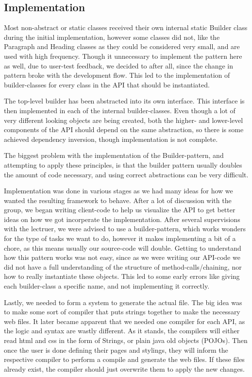 \documentclass[12pt]{article}
\begin{document}
    \subsection{Implementation}

    Most non-abstract or static classes received their own internal static Builder class during the initial implementation, however some classes did not, like the Paragraph and Heading classes as they could be considered very small, and are used with high frequency. Though it unnecessary to implement the pattern here as well, due to user-test feedback, we decided to after all, since the change in pattern broke with the development flow. This led to the implementation of builder-classes for every class in the API that should be instantiated.
    
    The top-level builder has been abstracted into its own interface. This interface is then implemented in each of the internal builder-classes. Even though a lot of very different looking objects are being created, both the higher- and lower-level components of the API should depend on the same abstraction, so there is some achieved dependency inversion, though implementation is not complete.

    The biggest problem with the implementation of the Builder-pattern, and attempting to apply these principles, is that the builder pattern usually doubles the amount of code necessary, and using correct abstractions can be very difficult.

    Implementation was done in various stages as we had many ideas for how we wanted the resulting framework to behave. After a lot of discussion with the group, we began writing client-code to help us visualize the API to get better ideas on how we got incorperate the implementation. After several supervisions with the lectruer, we were advised to use a builder-pattern, which works wonders for the type of tasks we want to do, however it makes implementing a bit of a chore, as this means usually our source-code will double. Getting to understand how this pattern works was not easy, since as we were writing our API-code we did not have a full understanding of the structure of method-calls/chaining, nor how to really instantiate these objects. This led to some early errors like giving each builder-class a specific name, and not implementing it correctly.


    Lastly, we needed to form a system to generate the actual file. The big idea was to make some sort of compiler that puts strings together to make the necessary web files. It later became apparent that we needed one compiler for each API, as the logic and syntax are wastly different. As it stands, the compilers will either read html and css in the form of Strings, or plain java old objects (POJOs). Then once the user is done defining their pages and stylings, they will inform the respective compiler to perform a compile and generate the web files. If these files already exist, the compiler should just overwrite them to apply the new changes.
\end{document}
